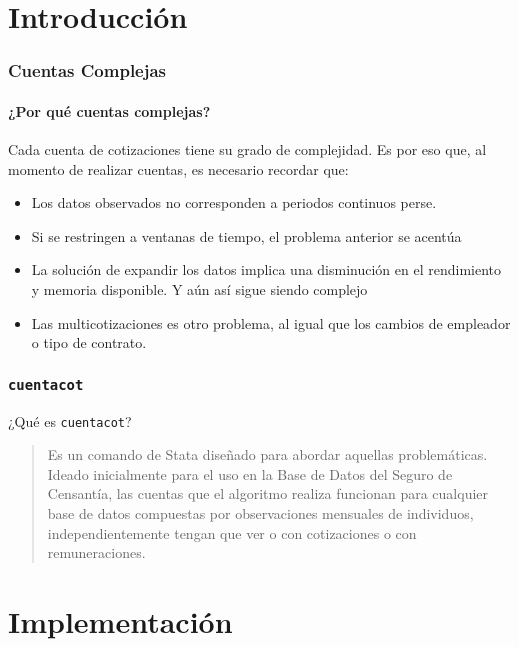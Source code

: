 \documentclass[8pt]{beamer}
\title[\subtit]{\tit}
\subtitle{\subtit}
\author[GVY]{George Vega Y.}
\institute[SPensiones]{\normalsize Superintendencia de Pensiones}
\date{enero de 2012}
\begin{document}
\begin{frame}
\transdissolve
\maketitle
\end{frame}


\section{Introducción}
\begin{frame}
\frametitle{Cuentas Complejas}
\framesubtitle{¿Por qué cuentas complejas?}
Cada cuenta de cotizaciones tiene su grado de complejidad. \pause Es por eso que, al momento de realizar cuentas, es necesario recordar que:\pause
\begin{itemize}
\item Los datos observados no corresponden a periodos continuos perse. \pause
\item Si se restringen a ventanas de tiempo, el problema anterior se acentúa \pause
\item La solución de expandir los datos implica una disminución en el rendimiento y memoria disponible. \pause Y aún así sigue siendo complejo \pause
\item Las multicotizaciones es otro problema, al igual que los cambios de empleador o tipo de contrato.
\end{itemize}
\end{frame}

\begin{frame}
\frametitle{\tt cuentacot}
¿Qué es {\tt cuentacot}?
\begin{quote}
Es un comando de Stata diseñado para abordar aquellas problemáticas. \pause Ideado inicialmente para el uso en la Base de Datos del Seguro de Censantía, las cuentas que el algoritmo realiza funcionan para cualquier base de datos compuestas por observaciones mensuales de individuos, \pause independientemente tengan que ver o con cotizaciones o con remuneraciones.
\end{quote}
\end{frame}

\section{Implementación}
\end{document}
